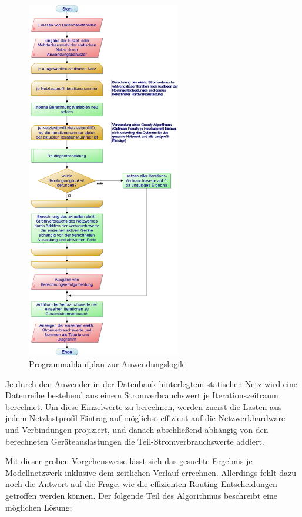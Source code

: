 \documentclass[12pt,titlepage]{article}
\begin{document}
\begin{figure}[!]
	\centering
	\includegraphics[width=0.6\textwidth]{1Berechnung_elektr_Stromverbrauch}
	\caption{Programmablaufplan zur Anwendungslogik}
	\label{fig:1Berechnung_elektr_Stromverbrauch}
\end{figure}


Je durch den Anwender in der Datenbank hinterlegtem statischen Netz wird eine Datenreihe bestehend aus einem Stromverbrauchswert je Iterationszeitraum berechnet.
Um diese Einzelwerte zu berechnen, werden zuerst die Lasten aus jedem Netzlastprofil-Eintrag auf möglichst effizient auf die Netzwerkhardware und Verbindungen projiziert, und danach abschließend abhängig von den berechneten Geräteauslastungen die Teil-Stromverbrauchswerte addiert.


Mit dieser groben Vorgehensweise lässt sich das gesuchte Ergebnis je Modellnetzwerk inklusive dem zeitlichen Verlauf errechnen. Allerdings fehlt dazu noch die Antwort auf die Frage, wie die effizienten Routing-Entscheidungen getroffen werden können. Der folgende Teil des Algorithmus beschreibt eine möglichen Lösung:
\end{document}
